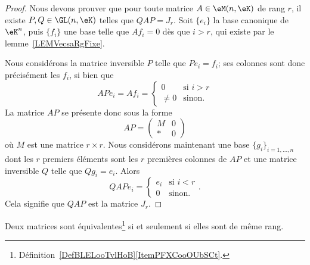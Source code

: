 \begin{proof}
    Nous devons prouver que pour toute matrice \( A\in\eM(n,\eK)\) de rang \( r\), il existe \( P,Q\in\GL(n,\eK)\) telles que \(QAP=J_r\). Soit \( \{ e_i \}\) la base canonique de \( \eK^n\), puis \( \{ f_i \}\) une base telle que \( Af_i=0\) dès que \( i>r\), qui existe par le lemme~\ref{LEMVecsaRgFixe}.

    Nous considérons la matrice inversible \( P\) telle que \( Pe_i=f_i\); ses colonnes sont donc précisément les \( f_i \), si bien que
    \begin{equation}
        APe_i=Af_i=\begin{cases}
            0    &   \text{si } i>r\\
            \neq 0    &    \text{sinon}.
        \end{cases}
    \end{equation}
    La matrice \( AP\) se présente donc sous la forme
    \begin{equation}
        AP=\begin{pmatrix}
            M    &   0    \\
            *    &   0
        \end{pmatrix}
    \end{equation}
    où \( M\) est une matrice \( r\times r\). Nous considérons maintenant une base \( \{ g_i \}_{i=1,\ldots, n}\) dont les \( r\) premiers éléments sont les \( r\) premières colonnes de \( AP\) et une matrice inversible \( Q\) telle que \( Qg_i=e_i\). Alors
    \begin{equation}
        QAPe_i=\begin{cases}
            e_i    &   \text{si } i<r\\
            0    &    \text{sinon}.
        \end{cases}.
    \end{equation}
    Cela signifie que \( QAP\) est la matrice \( J_r\).
\end{proof}

\begin{corollary}      \label{CorGOUYooErfOIe}
    Deux matrices sont équivalentes\footnote{Définition~\ref{DefBLELooTvlHoB}\ref{ItemPFXCooOUbSCt}.} si et seulement si elles sont de même rang.
\end{corollary}

